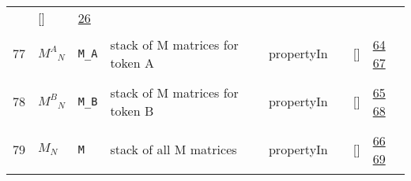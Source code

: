 \begin{longtable}{|p{1cm}|p{3cm}|p{3cm}|p{7cm}|p{3.0cm}|p{3cm}|p{2cm}|p{1cm}|}
             & []
             & \hyperlink{"e:26"}{ 26 }
                 \\
    77
             & \hypertarget{"v:77"}{ $ {{M^A}}{_{N}} $}
             & \verb|M_A|
             & stack of M matrices for token A
             & \begin{lay}propertyIn \end{lay}
             & $  $
             & []
             & \hyperlink{"e:64"}{ 64 }
                 \hyperlink{"e:67"}{ 67 }
                 \\
    78
             & \hypertarget{"v:78"}{ $ {{M^B}}{_{N}} $}
             & \verb|M_B|
             & stack of M matrices for token B
             & \begin{lay}propertyIn \end{lay}
             & $  $
             & []
             & \hyperlink{"e:65"}{ 65 }
                 \hyperlink{"e:68"}{ 68 }
                 \\
    79
             & \hypertarget{"v:79"}{ $ {M}{_{N}} $}
             & \verb|M|
             & stack of all M matrices
             & \begin{lay}propertyIn \end{lay}
             & $  $
             & []
             & \hyperlink{"e:66"}{ 66 }
                 \hyperlink{"e:69"}{ 69 }
                 \\
    \end{longtable}